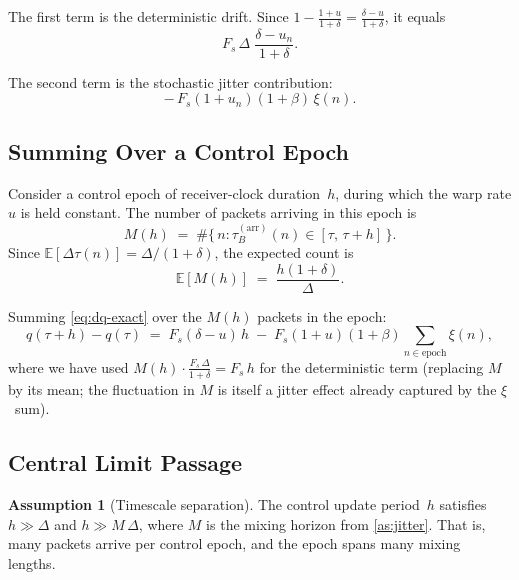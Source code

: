 \documentclass[11pt, a4paper]{article}
\theoremstyle{definition}
\newtheorem{assumption}{Assumption}[section]
\theoremstyle{plain}
\theoremstyle{remark}
\newcommand{\E}{\mathbb{E}}
\begin{document}
The first term is the deterministic drift. Since
$1 - \frac{1+u}{1+\delta} = \frac{\delta - u}{1+\delta}$,
it equals
\begin{equation}\label{eq:dq-drift}
  F_s\,\Delta\;\frac{\delta - u_n}{1+\delta}.
\end{equation}

The second term is the stochastic jitter contribution:
\begin{equation}\label{eq:dq-jitter}
  -\,F_s(1+u_n)(1+\beta)\,\xi(n).
\end{equation}

\subsection{Summing Over a Control Epoch}\label{sec:epoch-sum}

Consider a control epoch of receiver-clock duration~$h$, during which
the warp rate $u$ is held constant.  The number of packets arriving
in this epoch is
\begin{equation}\label{eq:epoch-count}
  M(h) \;=\; \#\bigl\{\,n : \tau_B^{(\text{arr})}(n) \in
    [\tau,\,\tau + h]\,\bigr\}.
\end{equation}
Since $\E[\Delta\tau(n)] = \Delta/(1+\delta)$, the expected count is
\begin{equation}\label{eq:epoch-count-mean}
  \E[M(h)] \;=\; \frac{h(1+\delta)}{\Delta}.
\end{equation}

Summing \eqref{eq:dq-exact} over the $M(h)$ packets in the epoch:
\begin{equation}\label{eq:dq-epoch}
  q(\tau+h) - q(\tau)
    \;=\; F_s(\delta - u)\,h
    \;-\; F_s(1+u)(1+\beta)\sum_{n \in \text{epoch}} \xi(n),
\end{equation}
where we have used
$M(h) \cdot \frac{F_s\,\Delta}{1+\delta} = F_s\,h$
for the deterministic term (replacing $M$ by its mean; the
fluctuation in $M$ is itself a jitter effect already captured
by the $\xi$~sum).

\subsection{Central Limit Passage}\label{sec:clt}

\begin{assumption}[Timescale separation]\label{as:timescale}
  The control update period~$h$ satisfies $h \gg \Delta$ and
  $h \gg M\,\Delta$, where $M$ is the mixing horizon from
  \cref{as:jitter}.  That is, many packets arrive per control
  epoch, and the epoch spans many mixing lengths.
\end{assumption}
\end{document}
